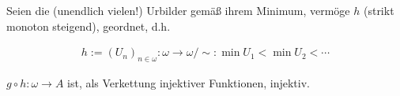 \begin{solution}
\begin{enumerate}[label = \arabic*.]
\begin{enumerate}[label = \arabic*.]
    \phantom{}

    Seien die (unendlich vielen!) Urbilder gemäß ihrem Minimum, vermöge $h$ (strikt monoton steigend), geordnet, d.h.

    \begin{align*}
      h := (U_n)_{n \in \omega}:
      \omega \to \omega / \sim:
      \min U_1 < \min U_2 < \cdots
    \end{align*}

    $g \circ h: \omega \to A$ ist, als Verkettung injektiver Funktionen, injektiv.

  \end{enumerate}

\end{enumerate}

\end{solution}

